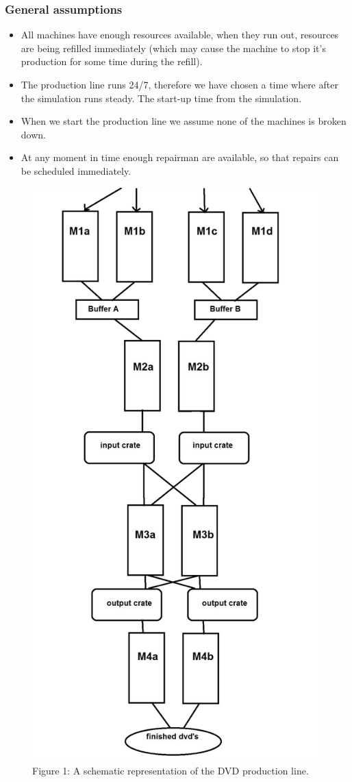 \documentclass[11pt,a4paper]{article}
\begin{document}
\subsubsection{General assumptions}
\begin{itemize}
\item All machines have enough resources available, when they run out, resources are being refilled immediately (which may cause the machine to stop it's production for some time during the refill).
\item The production line runs 24/7, therefore we have chosen a time where after the simulation runs steady. The start-up time from the simulation.
\item When we start the production line we assume none of the machines is broken down.
\item At any moment in time enough repairman are available, so that repairs can be scheduled immediately. 
\end{itemize}

\begin{figure}[H]
\centering
\includegraphics[height = 600 pt]{schemaPL.jpg}
\caption{Figure 1: A schematic representation of the DVD production line.}
\end{figure}
\end{document}
